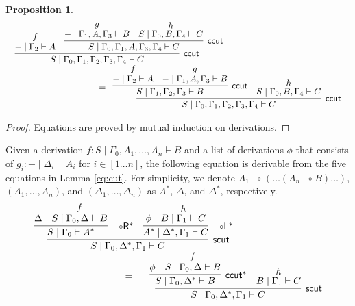\documentclass[sn-mathphys-num]{sn-jnl}%
\newcommand{\GG}{\Gamma}
\newcommand{\GD}{\Delta}
\newcommand{\vd}{\vdash}
\newcommand{\lolli}{\multimap}
\newcommand{\lleft}{{\lolli}\mathsf{L}}
\newcommand{\lright}{{\lolli}\mathsf{R}}
\newcommand{\mf}[1]{\mathsf{#1}}
\theoremstyle{thmstyleone}%
\newtheorem{proposition}[theorem]{Proposition}%
\theoremstyle{thmstyletwo}%
\theoremstyle{thmstylethree}%
\begin{document}
\begin{proposition}
      \begin{displaymath}
      \begin{array}{l}
      \begin{array}{c}
        \infer[\mf{ccut}]{S \mid \GG_0 , \GG_1 , \GG_2 , \GG_3 , \GG_4 \vd C}{
          \deduce{{-} \mid \GG_2 \vd A}{f}
          &
          \infer[\mf{ccut}]{S \mid \GG_0 , \GG_1 , A , \GG_3 , \GG_4 \vd C}{
            \deduce{{-} \mid \GG_1 , A , \GG_3 \vd B}{g}
            &
            \deduce{S \mid \GG_0 , B , \GG_4 \vd C}{h}
          }
        }
      \end{array}
      \\[10pt]
      \qquad \qquad \qquad \qquad \qquad  =
      \begin{array}{c}
        \infer[\mf{ccut}]{S \mid \GG_0 , \GG_1 , \GG_2 , \GG_3 , \GG_4 \vd C}{
          \infer[\mf{ccut}]{S \mid \GG_1 , \GG_2 , \GG_3 \vd B}{
            \deduce{{-} \mid \GG_2 \vd A}{f}
            &
            \deduce{{-} \mid \GG_1 , A , \GG_3 \vd B}{g}
          }
          &
          \deduce{S \mid \GG_0 , B , \GG_4 \vd C}{h}
        }
      \end{array}
    \end{array}
   \end{displaymath}
\end{proposition}
\begin{proof}
  Equations are proved by mutual induction on derivations.
\end{proof}
Given a derivation $f : S \mid \GG_0 , A_1, \dots , A_n \vd B$ and a list of derivations $\phi$ that consists of $g_i : {-} \mid \GD_i \vd A_i$ for $i \in [1 \dots n]$, the following equation is derivable from the five equations in Lemma \ref{eq:cut}.
For simplicity, we denote $A_1 \lolli (\dots (A_n \lolli B) \dots)$, $(A_1 , \dots , A_n)$, and $(\GD_1 , \dots , \GD_n)$ as $A^*$, $\GD$, and $\GD^*$, respectively.
   \begin{equation}\label{scut-or-ols}
   \begin{array}{l}
    \begin{array}{c}
    \infer[\mf{scut}]{S \mid \GG_0, \GD^*, \GG_1 \vd C}{
      \infer[\lright^*]{S \mid \GG_0 \vd A^*}{
        \GD
        &
        \deduce{S \mid \GG_0 , \GD \vd B}{f}
      }
      &
      \infer[\lleft^*]{A^* \mid \GD^* , \GG_1 \vd C}{
        \phi
        &
        \deduce{B \mid \GG_1 \vd C}{h}
      }
    }
   \end{array}
   \\[10pt]
   \qquad \qquad \qquad \qquad \qquad
   = 
   \quad
    \begin{array}{c}
      \infer[\mf{scut}]{S \mid \GG_0 , \GD^* , \GG_1 \vd C}{
        \infer[\mf{ccut}^*]{S \mid \GG_0 , \GD^* \vd B}{
          \phi
          &
          \deduce{S \mid \GG_0 , \GD \vd B}{f}
        }
        &
        \deduce{B \mid \GG_1 \vd C}{h}
      }
    \end{array}
   \end{array}
   \end{equation}
\end{document}
